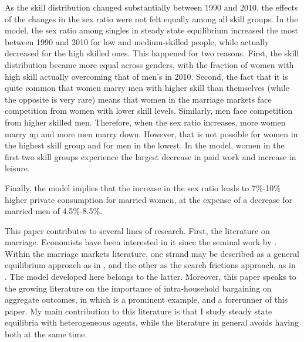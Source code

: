 \documentclass[12pt]{article}
\begin{document}
As the skill distribution changed substantially between 1990 and 2010, the effects of the changes in the sex ratio were not felt equally among all skill groups. In the model, the sex ratio among singles in steady state equilibrium increased the most between 1990 and 2010 for low and medium-skilled people, while actually decreased for the high skilled ones. This happened for two reasons. First, the skill distribution became more equal across genders, with the fraction of women with high skill actually overcoming that of men's in 2010. Second, the fact that it is quite common that women marry men with higher skill than themselves (while the opposite is very rare) means that women in the marriage markets face competition from women with lower skill levels. Similarly, men face competition from higher skilled men. Therefore, when the sex ratio increases, more women marry up and more men marry down. However, that is not possible for women in the highest skill group and for men in the lowest. In the model, women in the first two skill groups experience the largest decrease in paid work and increase in leisure.

Finally, the model implies that the increase in the sex ratio leads to 7\%-10\% higher private consumption for married women, at the expense of a decrease for married men of 4.5\%-8.5\%.

This paper contributes to several lines of research. First, the literature on marriage. Economists have been interested in it since the seminal work by \cite{becker73,becker74}. Within the marriage markets literature, one strand may be described as a general equilibrium approach as in \cite{chiapporiweiss06}, and the other as the search frictions approach, as in \cite{greenwoodetal16}. The model developed here belongs to the latter. Moreover, this paper speaks to the growing literature on the importance of intra-household bargaining on aggregate outcomes, in which \cite{knowles13} is a prominent example, and a forerunner of this paper. My main contribution to this literature is that I study steady state equilibria with heterogeneous agents, while the literature in general avoids having both at the same time. 
\end{document}
